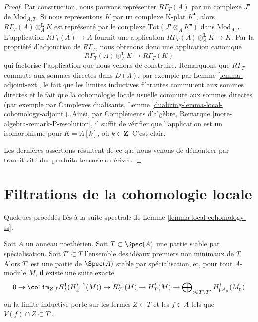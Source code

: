 \begin{proof}
Par construction, nous pouvons représenter $R\Gamma_T(A)$ par un complexe $J^\bullet$ de
$\text{Mod}_{A, T}$. Si nous représentons $K$ par un complexe K-plat $K^\bullet$,
alors $R\Gamma_T(A) \otimes_A^\mathbf{L} K$ est représenté
par le complexe $\text{Tot}(J^\bullet \otimes_A K^\bullet)$ dans
$\text{Mod}_{A, T}$. L'application $R\Gamma_T(A) \to A$ fournit
une application $R\Gamma_T(A) \otimes_A^\mathbf{L} K\to K$. Par la propriété
d'adjonction de $R\Gamma_T$, nous obtenons donc une application canonique
$$
R\Gamma_T(A) \otimes_A^\mathbf{L} K \longrightarrow R\Gamma_T(K)
$$
qui factorise l'application que nous venons de construire. Remarquons que $R\Gamma_T$ commute
aux sommes directes dans $D(A)$, par exemple par Lemme \ref{lemma-adjoint-ext},
le fait que les limites inductives filtrantes commutent aux sommes directes et le
fait que la cohomologie locale usuelle commute aux sommes directes
(par exemple par Complexes dualisants, Lemme
\ref{dualizing-lemma-local-cohomology-adjoint}).
Ainsi, par Compléments d'algèbre, Remarque \ref{more-algebra-remark-P-resolution},
il suffit de vérifier que l'application est un isomorphisme pour
$K = A[k]$, où $k \in \mathbf{Z}$. C'est clair.

\medskip\noindent
Les dernières assertions résultent de ce que nous venons de démontrer
par transitivité des produits tensoriels dérivés.
\end{proof}





\section{Filtrations de la cohomologie locale}
\label{section-filter-local-cohomology}

\noindent
Quelques procédés liés à la suite spectrale de
Lemme \ref{lemma-local-cohomology-ss}.

\begin{lemma}
\label{lemma-filter-local-cohomology}
Soit $A$ un anneau noethérien. Soit $T \subset \Spec(A)$
une partie stable par spécialisation. Soit $T' \subset T$
l'ensemble des idéaux premiers non minimaux de $T$. Alors $T'$
est une partie de $\Spec(A)$ stable par spécialisation,
et, pour tout $A$-module $M$, il existe une suite exacte
$$
0 \to
\colim_{Z, f} H^1_f(H^{i - 1}_Z(M)) \to
H^i_{T'}(M) \to H^i_T(M) \to
\bigoplus\nolimits_{\mathfrak p \in T \setminus T'}
H^i_{\mathfrak p A_\mathfrak p}(M_\mathfrak p)
$$
où la limite inductive porte sur les fermés $Z \subset T$
et les $f \in A$ tels que $V(f) \cap Z \subset T'$.
\end{lemma}

